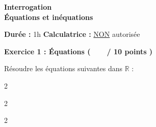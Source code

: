 \documentclass[12pt,a4paper]{exam}
\begin{document}
\begin{center}
    \Large\textbf{Interrogation\\Équations et inéquations}
\end{center}

\vspace{0.3cm}

\noindent
\textbf{Durée :} 1h \hfill
\textbf{Calculatrice :} \underline{NON} autorisée

\vspace{0.5cm}

\noindent
\textbf{Exercice 1 : Équations (\ \ \ \  / 10 points )}
\vspace{5pt}

\begin{questions}

\question[1] Résoudre les équations suivantes dans $\mathbb{R}$ :
\begin{multicols}{2}
\end{multicols}
\begin{multicols}{2}
\end{multicols}
\begin{multicols}{2}
\end{multicols}

\end{questions}
\end{document}
